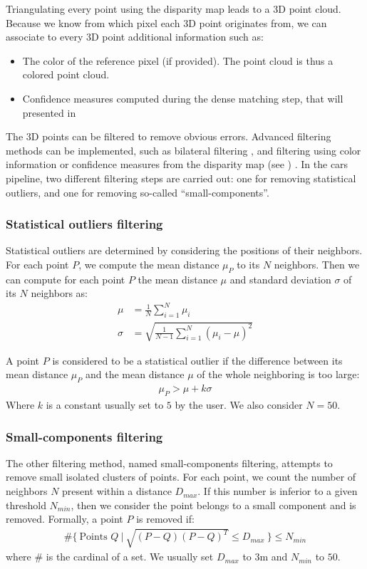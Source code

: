 Triangulating every point using the disparity map leads to a 3D point cloud. Because we know from which pixel each 3D point originates from, we can associate to every 3D point additional information such as:
\begin{itemize}
    \item The color of the reference pixel (if provided). The point cloud is thus a colored point cloud.
    \item Confidence measures computed during the dense matching step, that will presented in 
\end{itemize}

The 3D points can be filtered to remove obvious errors. Advanced filtering methods can be implemented, such as bilateral filtering \cite{digne_bilateral_2017}, and filtering using color information or confidence measures from the disparity map (see ) \cite{youssefi_geometrically_2024}. In the \acrshort{cars} pipeline, two different filtering steps are carried out: one for removing statistical outliers, and one for removing so-called ``small-components''.

\subsubsection{Statistical outliers filtering}
Statistical outliers are determined by considering the positions of their neighbors. For each point $P$, we compute the mean distance $\mu_P$ to its $N$ neighbors. Then we can compute for each point $P$ the mean distance $\mu$ and standard deviation $\sigma$ of its $N$ neighbors as:
\begin{align}
    \mu &= \frac{1}{N}\sum_{i=1}^N\mu_i\\
    \sigma &= \sqrt{\frac{1}{N-1}\sum_{i=1}^N(\mu_i-\mu)^2}
\end{align}

A point $P$ is considered to be a statistical outlier if the difference between its mean distance $\mu_P$ and the mean distance $\mu$ of the whole neighboring is too large:
\begin{align}\label{eq:statistical_outlier}
    \mu_P>\mu+k\sigma
\end{align}
Where $k$ is a constant usually set to $5$ by the user. We also consider $N=50$.

\subsubsection{Small-components filtering}
The other filtering method, named small-components filtering, attempts to remove small isolated clusters of points. For each point, we count the number of neighbors $N$ present within a distance $D_{max}$. If this number is inferior to a given threshold $N_{min}$, then we consider the point belongs to a small component and is removed. Formally, a point $P$ is removed if:
\begin{align}\label{eq:small_components}
    \#\{~\text{Points } Q~|~\sqrt{(P-Q)(P-Q)^T}\leqslant D_{max}~\}\leqslant N_{min}
\end{align}
where $\#$ is the cardinal of a set. We usually set $D_{max}$ to $3$m and $N_{min}$ to $50$.

